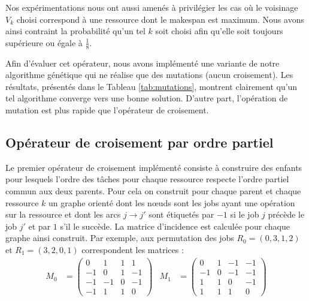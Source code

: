 \documentclass[french]{rapport}
\begin{document}
Nos expérimentations nous ont aussi amenés à privilégier les cas où le voisinage $V_k$ choisi
correspond à une ressource dont le makespan est maximum. Nous avons ainsi contraint la probabilité
qu'un tel $k$ soit choisi afin qu'elle soit toujours supérieure ou égale à $\frac{1}{8}$.

Afin d'évaluer cet opérateur, nous avons implémenté une variante de notre algorithme génétique qui
ne réalise que des mutations (aucun croisement). Les résultats, présentés dans le Tableau
\ref{tab:mutations}, montrent clairement qu'un tel algorithme converge vers une bonne solution.
D'autre part, l'opération de mutation est plus rapide que l'opérateur de croisement.



\subsection{Opérateur de croisement par ordre partiel}

Le premier opérateur de croisement implémenté consiste à construire des enfants pour lesquels
l'ordre des tâches pour chaque ressource respecte l'ordre partiel commun aux deux parents. Pour cela
on construit pour chaque parent et chaque ressource $k$ un graphe orienté dont les nœuds sont les jobs
ayant une opération sur la ressource et dont les arcs $j \rightarrow j'$ sont étiquetés par $-1$ si le
job $j$ précède le job $j'$ et par $1$ s'il le succède. La matrice d'incidence est calculée pour
chaque graphe ainsi construit.
Par exemple, aux permutation des jobs $R_0 = (0,3,1,2)$ et $R_1 = (3,2,0,1)$ correspondent les
matrices :
\begin{align*} 
  M_0 &= \begin{pmatrix}
   0 &  1 &  1 &  1 \\
  -1 &  0 &  1 & -1 \\
  -1 & -1 &  0 & -1 \\
  -1 &  1 &  1 &  0
  \end{pmatrix} &
  M_1 &= \begin{pmatrix}
   0 &  1 & -1 & -1 \\
  -1 &  0 & -1 & -1 \\
   1 &  1 &  0 & -1 \\
   1 &  1 &  1 &  0
  \end{pmatrix}
\end{align*}
\end{document}

